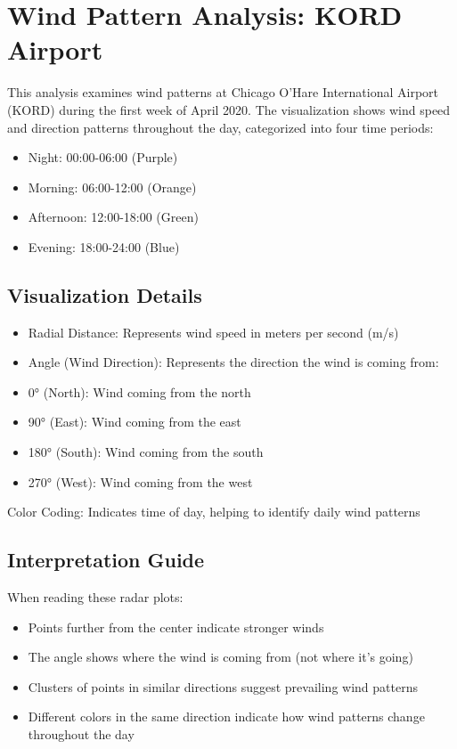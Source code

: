 \section{Wind Pattern Analysis: KORD Airport}
This analysis examines wind patterns at Chicago O'Hare International Airport (KORD) during the first week of April 2020. The visualization shows wind speed and direction patterns throughout the day, categorized into four time periods:\begin{itemize}
  \item Night: 00:00-06:00 (Purple)
  \item Morning: 06:00-12:00 (Orange)
  \item Afternoon: 12:00-18:00 (Green)
  \item Evening: 18:00-24:00 (Blue)
\end{itemize}
\subsection{Visualization Details}
\begin{itemize}
  \item Radial Distance: Represents wind speed in meters per second (m/s)
  \item Angle (Wind Direction): Represents the direction the wind is coming from:
\end{itemize}
\begin{itemize}
  \item 0° (North): Wind coming from the north
  \item 90° (East): Wind coming from the east
  \item 180° (South): Wind coming from the south
  \item 270° (West): Wind coming from the west
\end{itemize}
Color Coding: Indicates time of day, helping to identify daily wind patterns
\subsection{Interpretation Guide}
When reading these radar plots:\begin{itemize}
  \item Points further from the center indicate stronger winds
  \item The angle shows where the wind is coming from (not where it's going)
  \item Clusters of points in similar directions suggest prevailing wind patterns
  \item Different colors in the same direction indicate how wind patterns change throughout the day
\end{itemize}


